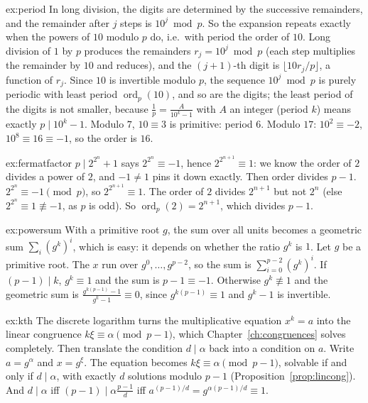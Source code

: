 \begin{solution}{ex:period}
\idea In long division, the digits are determined by the successive remainders, and the remainder after $j$ steps is $10^j\bmod p$. So the expansion repeats exactly when the powers of $10$ modulo $p$ do, i.e.\ with period the order of $10$.
\writeup Long division of $1$ by $p$ produces the remainders $r_j=10^j\bmod p$ (each step multiplies the remainder by $10$ and reduces), and the $(j+1)$-th digit is $\lfloor10r_j/p\rfloor$, a function of $r_j$. Since $10$ is invertible modulo $p$, the sequence $10^j\bmod p$ is purely periodic with least period $\operatorname{ord}_p(10)$, and so are the digits; the least period of the digits is not smaller, because $\frac1p=\frac{A}{10^k-1}$ with $A$ an integer (period $k$) means exactly $p\mid10^k-1$. Modulo $7$, $10\equiv3$ is primitive: period $6$. Modulo $17$: $10^2\equiv-2$, $10^8\equiv16\equiv-1$, so the order is $16$.
\end{solution}

\begin{solution}{ex:fermatfactor}
\idea $p\mid2^{2^n}+1$ says $2^{2^n}\equiv-1$, hence $2^{2^{n+1}}\equiv1$: we know the order of $2$ divides a power of $2$, and $-1\ne1$ pins it down exactly. Then order divides $p-1$.
\writeup $2^{2^n}\equiv-1\pmod p$, so $2^{2^{n+1}}\equiv1$. The order of $2$ divides $2^{n+1}$ but not $2^n$ (else $2^{2^n}\equiv1\not\equiv-1$, as $p$ is odd). So $\operatorname{ord}_p(2)=2^{n+1}$, which divides $p-1$.
\end{solution}

\begin{solution}{ex:powersum}
\idea With a primitive root $g$, the sum over all units becomes a geometric sum $\sum_i(g^k)^i$, which is easy: it depends on whether the ratio $g^k$ is $1$.
\writeup Let $g$ be a primitive root. The $x$ run over $g^0,\dots,g^{p-2}$, so the sum is $\sum_{i=0}^{p-2}(g^k)^i$. If $(p-1)\mid k$, $g^k\equiv1$ and the sum is $p-1\equiv-1$. Otherwise $g^k\not\equiv1$ and the geometric sum is $\frac{g^{k(p-1)}-1}{g^k-1}\equiv0$, since $g^{k(p-1)}\equiv1$ and $g^k-1$ is invertible.
\end{solution}

\begin{solution}{ex:kth}
\idea The discrete logarithm turns the multiplicative equation $x^k=a$ into the linear congruence $k\xi\equiv\alpha\pmod{p-1}$, which Chapter~\ref{ch:congruences} solves completely. Then translate the condition $d\mid\alpha$ back into a condition on $a$.
\writeup Write $a=g^\alpha$ and $x=g^\xi$. The equation becomes $k\xi\equiv\alpha\pmod{p-1}$, solvable if and only if $d\mid\alpha$, with exactly $d$ solutions modulo $p-1$ (Proposition~\ref{prop:lincong}). And $d\mid\alpha$ iff $(p-1)\mid\alpha\frac{p-1}d$ iff $a^{(p-1)/d}=g^{\alpha(p-1)/d}\equiv1$.
\end{solution}

